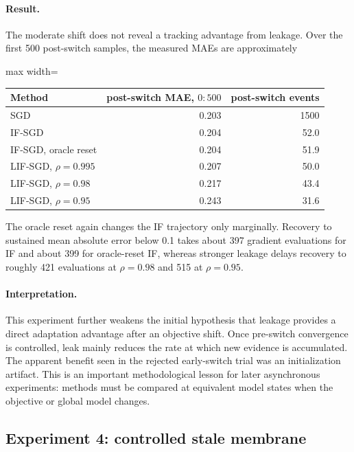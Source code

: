 \paragraph{Result.}
The moderate shift does not reveal a tracking advantage from leakage. Over the first 500 post-switch samples, the measured MAEs are approximately
\begin{center}
\begin{adjustbox}{max width=\textwidth}
\begin{tabular}{lrr}
\toprule
Method & post-switch MAE, $0{:}500$ & post-switch events \\
\midrule
SGD & 0.203 & 1500 \\
IF-SGD & 0.204 & 52.0 \\
IF-SGD, oracle reset & 0.204 & 51.9 \\
LIF-SGD, $\rho=0.995$ & 0.207 & 50.0 \\
LIF-SGD, $\rho=0.98$ & 0.217 & 43.4 \\
LIF-SGD, $\rho=0.95$ & 0.243 & 31.6 \\
\bottomrule
\end{tabular}
\end{adjustbox}
\end{center}
The oracle reset again changes the IF trajectory only marginally. Recovery to sustained mean absolute error below 0.1 takes about 397 gradient evaluations for IF and about 399 for oracle-reset IF, whereas stronger leakage delays recovery to roughly 421 evaluations at $\rho=0.98$ and 515 at $\rho=0.95$.

\paragraph{Interpretation.}
This experiment further weakens the initial hypothesis that leakage provides a direct adaptation advantage after an objective shift. Once pre-switch convergence is controlled, leak mainly reduces the rate at which new evidence is accumulated. The apparent benefit seen in the rejected early-switch trial was an initialization artifact. This is an important methodological lesson for later asynchronous experiments: methods must be compared at equivalent model states when the objective or global model changes.

\subsection{Experiment 4: controlled stale membrane}

